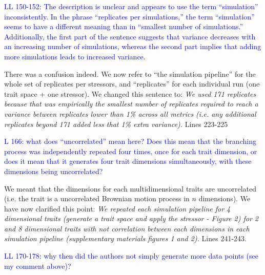 \documentclass[
]{article}
\begin{document}

\textcolor{blue}{LL 150-152: The description is unclear and appears to use the term ``simulation'' inconsistently.
In the phrase ``replicates per simulations,'' the term ``simulation'' seems to have a different meaning than in ``smallest number of simulations.'' Additionally, the first part of the sentence suggests that variance decreases with an increasing number of simulations, whereas the second part implies that adding more simulations leads to increased variance.}

There was a confusion indeed.
We now refer to ``the simulation pipeline'' for the whole set of replicates per stressors, and ``replicates'' for each individual run (one trait space + one stressor).
We changed this sentence to:
\textit{We used 171 replicates because that was empirically the smallest number of replicates required to reach a variance between replicates lower than 1\% across all metrics (i.e. any additional replicates beyond 171 added less that 1\% extra variance).}
Lines 223-225

\textcolor{blue}{L 166: what does ``uncorrelated'' mean here? Does this mean that the branching process was independently repeated four times, once for each trait dimension, or does it mean that it generates four trait dimensions simultaneously, with these dimensions being uncorrelated?}

We meant that the dimensions for each multidimensional traits are uncorrelated (i.e. the trait is a uncorrelated Brownian motion process in $n$ dimensions).
We have now clarified this point:
\textit{We repeated each simulation pipeline for 4 dimensional traits (generate a trait space and apply the stressor - Figure 2) for 2 and 8 dimensional traits with not correlation between each dimensions in each simulation pipeline (supplementary materials figures 1 and 2).}
Lines 241-243.

\textcolor{blue}{LL 170-178: why then did the authors not simply generate more data points (see my comment above)?}
\end{document}
